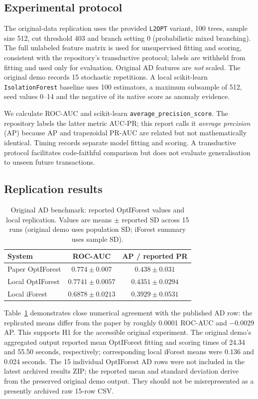 \documentclass[11pt]{article}
\begin{document}
\subsection{Experimental protocol}
The original-data replication uses the provided \texttt{L2OPT} variant, 100 trees, sample size 512, cut threshold 403 and branch setting 0 (probabilistic mixed branching). The full unlabeled feature matrix is used for unsupervised fitting and scoring, consistent with the repository's transductive protocol; labels are withheld from fitting and used only for evaluation. Original AD features are \emph{not} scaled. The original demo records 15 stochastic repetitions. A local scikit-learn \texttt{IsolationForest} baseline uses 100 estimators, a maximum subsample of 512, seed values 0--14 and the negative of its native score as anomaly evidence.
 
We calculate ROC-AUC and scikit-learn \texttt{average\_precision\_score}. The repository labels the latter metric AUC-PR; this report calls it \emph{average precision} (AP) because AP and trapezoidal PR-AUC are related but not mathematically identical. Timing records separate model fitting and scoring. A transductive protocol facilitates code-faithful comparison but does not evaluate generalisation to unseen future transactions.
 
\subsection{Replication results}
\begin{table}[t]
\centering\small
\caption{Original AD benchmark: reported OptIForest values and local replication. Values are means $\pm$ reported SD across 15 runs (original demo uses population SD; iForest summary uses sample SD).}
\label{tab:replication}
\begin{tabular}{@{}lcc@{}}
\toprule
System & ROC-AUC & AP / reported PR \\
\midrule
Paper OptIForest & $0.774\pm0.007$ & $0.438\pm0.031$ \\
Local OptIForest & $0.7741\pm0.0057$ & $0.4351\pm0.0294$ \\
Local iForest & $0.6878\pm0.0213$ & $0.3929\pm0.0531$ \\
\bottomrule
\end{tabular}
\end{table}
 
Table~\ref{tab:replication} demonstrates close numerical agreement with the published AD row: the replicated means differ from the paper by roughly 0.0001 ROC-AUC and $-0.0029$ AP. This supports H1 for the accessible original experiment. The original demo's aggregated output reported mean OptIForest fitting and scoring times of 24.34 and 55.50 seconds, respectively; corresponding local iForest means were 0.136 and 0.024 seconds. The 15 individual OptIForest AD rows were not included in the latest archived results ZIP; the reported mean and standard deviation derive from the preserved original demo output. They should not be misrepresented as a presently archived raw 15-row CSV.
 
\end{document}
